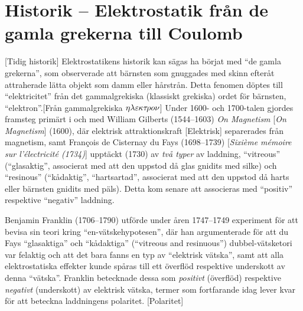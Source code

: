 \section{Historik -- Elektrostatik fr{\aa}n de gamla grekerna till Coulomb}
[Tidig historik]
Elektrostatikens historik
kan s{\"a}gas ha b{\"o}rjat med ``de gamla grekerna'', som observerade att
b{\"a}rnsten som gnuggades med skinn efter{\aa}t attraherade l{\"a}tta objekt
som damm eller h{\aa}rstr{\aa}n. Detta fenomen d{\"o}ptes till ``elektricitet''
fr{\aa}n det gammalgrekiska (klassiskt grekiska) ordet f{\"o}r b{\"a}rnsten,
``elektron''.[Fr{\aa}n gammalgrekiska
  $\eta\lambda\varepsilon\kern-.4pt\kappa\tau\kern-1.4pt\rho o\nu$]
Under 1600- och 1700-talen gjordes framsteg prim{\"a}rt i och med William
Gilberts  (1544--1603)
{\it On Magnetism} [{{\it On Magnetism}}]
(1600), d{\"a}r elektrisk attraktionskraft [Elektrisk]
separerades fr{\aa}n magnetism, samt
Fran\c{c}ois de Cisternay du Fays (1698--1739) [{{\it Sixi\`eme m\'emoire sur l'\'electricit\'e
(1734)}}] uppt{\"a}ckt (1730) av {\it tv{\aa}
typer} av laddning, ``vitreous'' (``glasaktig'', associerat med att den uppstod
d{\aa} glas gnidits med silke) och ``resinous'' (``k{\aa}daktig'',
``hartsartad'', associerat med att den uppstod d{\aa} harts eller b{\"a}rnsten
gnidits med p{\"a}ls). Detta kom senare att associeras med ``positiv''
respektive ``negativ'' laddning.

Benjamin Franklin  (1706--1790)
utf{\"o}rde under {\aa}ren 1747--1749 experiment f{\"o}r att bevisa sin teori
kring ``en-v{\"a}tske\-hypo\-tesen'', d{\"a}r han argumenterade f{\"o}r att du
Fays ``glasaktiga'' och ``k{\aa}daktiga'' (``vitreous and resinuous'')
dubbel-v{\"a}tsketori var felaktig och att det bara fanns en typ av ``elektrisk
v{\"a}tska'', samt att alla elektrostatiska effekter kunde sp{\aa}ras till ett
{\"o}verfl{\"o}d respektive underskott av denna ``v{\"a}tska''.
Franklin betecknade dessa som {\it positivt} ({\"o}verfl{\"o}d) respektive
{\it negativt} (underskott) av elektrisk v{\"a}tska, termer som fortfarande
idag lever kvar f{\"o}r att beteckna laddningens polaritet.%
[Polaritet]

